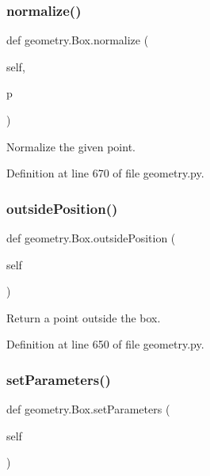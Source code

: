 \subsubsection{\texorpdfstring{normalize()}{normalize()}}
{\footnotesize\ttfamily def geometry.\+Box.\+normalize (\begin{DoxyParamCaption}\item[{}]{self,  }\item[{}]{p }\end{DoxyParamCaption})}

\begin{DoxyVerb}Normalize the given point.\end{DoxyVerb}
 

Definition at line 670 of file geometry.\+py.

\mbox{\label{classgeometry_1_1Box_a6bd75c486ba4bb587c3003484be1bc6d}} 
\subsubsection{\texorpdfstring{outside\+Position()}{outsidePosition()}}
{\footnotesize\ttfamily def geometry.\+Box.\+outside\+Position (\begin{DoxyParamCaption}\item[{}]{self }\end{DoxyParamCaption})}

\begin{DoxyVerb}Return a point outside the box.\end{DoxyVerb}
 

Definition at line 650 of file geometry.\+py.

\mbox{\label{classgeometry_1_1Box_a2af13fbaf9c38d904e05d73e35b5f9f9}} 
\subsubsection{\texorpdfstring{set\+Parameters()}{setParameters()}}
{\footnotesize\ttfamily def geometry.\+Box.\+set\+Parameters (\begin{DoxyParamCaption}\item[{}]{self }\end{DoxyParamCaption})}

